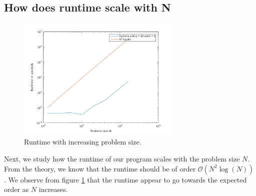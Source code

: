 \subsection*{How does runtime scale with N}
\begin{figure}[h]
			\centering
			\includegraphics[width=0.7\textwidth]{./figures/runtimeN}
			\caption{Runtime with increasing problem size.}
			\label{fig:runtimeN}
\end{figure}
Next, we study how the runtime of our program scales with the problem size $N$. From the theory, we know that the runtime should be of order $\mathcal{O}(N^2\log(N))$. We observe from figure \ref{fig:runtimeN} that the runtime appear to go towards the expected order as $N$ increases.
